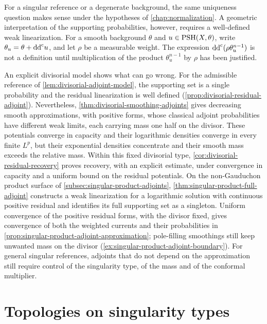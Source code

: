 For a singular reference or a degenerate background, the same uniqueness question makes sense under the hypotheses of \cref{chap:normalization}. A geometric interpretation of the supporting probabilities, however, requires a well-defined weak linearization. For a smooth background $\theta$ and $u\in\mathrm{PSH}(X,\theta)$, write $\theta_u=\theta+\mathrm{dd}^{\mathrm{c}} u$, and let $\rho$ be a measurable weight. The expression $\mathrm{dd}^{\mathrm{c}}(\rho\theta_u^{n-1})$ is not a definition until multiplication of the product $\theta_u^{n-1}$ by $\rho$ has been justified.

An explicit divisorial model shows what can go wrong. For the admissible reference of \cref{lem:divisorial-adjoint-model}, the supporting set is a single probability and the residual linearization is well defined (\cref{prop:divisorial-residual-adjoint}). Nevertheless, \cref{thm:divisorial-smoothing-adjoints} gives decreasing smooth approximations, with positive forms, whose classical adjoint probabilities have different weak limits, each carrying mass one half on the divisor. These potentials converge in capacity and their logarithmic densities converge in every finite $L^p$, but their exponential densities concentrate and their smooth mass exceeds the relative mass. Within this fixed divisorial type, \cref{cor:divisorial-residual-recovery} proves recovery, with an explicit estimate, under convergence in capacity and a uniform bound on the residual potentials. On the non-Gauduchon product surface of \cref{subsec:singular-product-adjoints}, \cref{thm:singular-product-full-adjoint} constructs a weak linearization for a logarithmic solution with continuous positive residual and identifies its full supporting set as a singleton. Uniform convergence of the positive residual forms, with the divisor fixed, gives convergence of both the weighted currents and their probabilities in \cref{prop:singular-product-adjoint-approximation}; pole-filling smoothings still keep unwanted mass on the divisor (\cref{ex:singular-product-adjoint-boundary}). For general singular references, adjoints that do not depend on the approximation still require control of the singularity type, of the mass and of the conformal multiplier.

\section{Topologies on singularity types}

